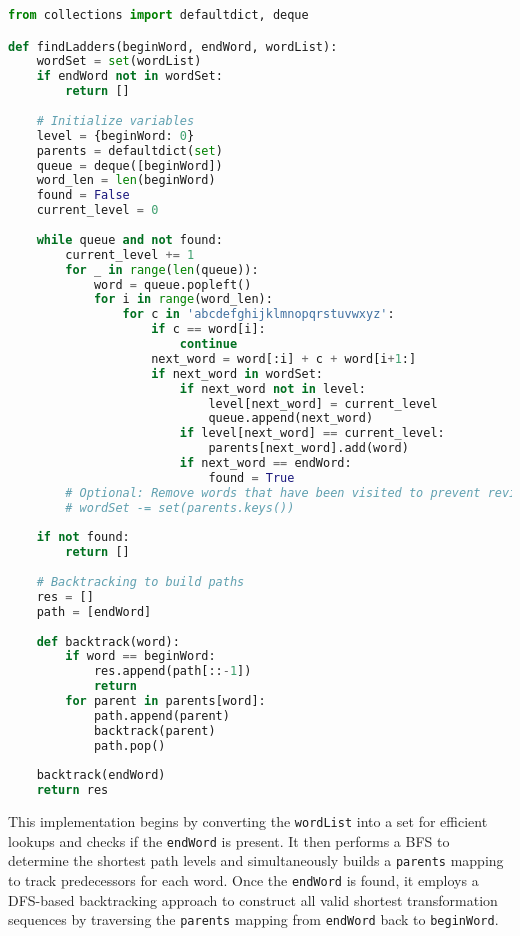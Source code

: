 \begin{fullwidth}
\begin{lstlisting}[language=Python]
from collections import defaultdict, deque

def findLadders(beginWord, endWord, wordList):
    wordSet = set(wordList)
    if endWord not in wordSet:
        return []
    
    # Initialize variables
    level = {beginWord: 0}
    parents = defaultdict(set)
    queue = deque([beginWord])
    word_len = len(beginWord)
    found = False
    current_level = 0
    
    while queue and not found:
        current_level += 1
        for _ in range(len(queue)):
            word = queue.popleft()
            for i in range(word_len):
                for c in 'abcdefghijklmnopqrstuvwxyz':
                    if c == word[i]:
                        continue
                    next_word = word[:i] + c + word[i+1:]
                    if next_word in wordSet:
                        if next_word not in level:
                            level[next_word] = current_level
                            queue.append(next_word)
                        if level[next_word] == current_level:
                            parents[next_word].add(word)
                        if next_word == endWord:
                            found = True
        # Optional: Remove words that have been visited to prevent revisiting
        # wordSet -= set(parents.keys())
    
    if not found:
        return []
    
    # Backtracking to build paths
    res = []
    path = [endWord]
    
    def backtrack(word):
        if word == beginWord:
            res.append(path[::-1])
            return
        for parent in parents[word]:
            path.append(parent)
            backtrack(parent)
            path.pop()
    
    backtrack(endWord)
    return res
\end{lstlisting}
\end{fullwidth}

This implementation begins by converting the \texttt{wordList} into a set for efficient lookups and checks if the \texttt{endWord} is present. It then performs a BFS to determine the shortest path levels and simultaneously builds a \texttt{parents} mapping to track predecessors for each word. Once the \texttt{endWord} is found, it employs a DFS-based backtracking approach to construct all valid shortest transformation sequences by traversing the \texttt{parents} mapping from \texttt{endWord} back to \texttt{beginWord}.

